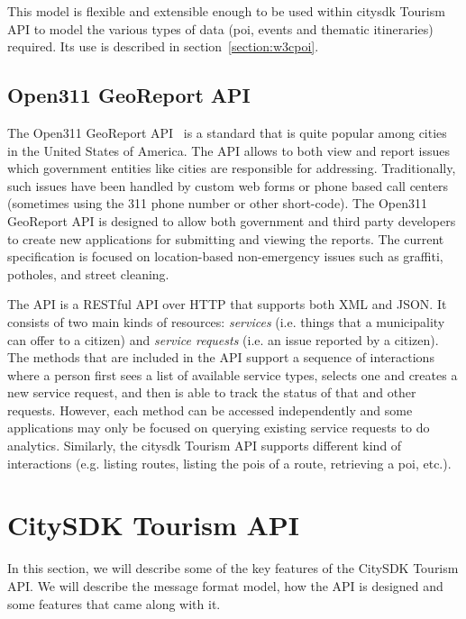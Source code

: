 \documentclass[times,doublespace]{ettauth}%
\begin{document}
This model is flexible and extensible enough to be used within \ac{citysdk} Tourism API to model the various types of data (\ac{poi}, events and thematic itineraries) required.
Its use is described in section~\ref{section:w3cpoi}.

\subsection{Open311 GeoReport API}
The Open311 GeoReport API~\cite{open311} is a standard that is quite popular among cities in the United States of America.
The API allows to both view and report issues which government entities like cities are responsible for addressing.
Traditionally, such issues have been handled by custom web forms or phone based call centers (sometimes using the 311 phone number or other short-code).
The Open311 GeoReport API is designed to allow both government and third party developers to create new applications for submitting and viewing the reports.
The current specification is focused on location-based non-emergency issues such as graffiti, potholes, and street cleaning.

The API is a RESTful API over HTTP that supports both XML and JSON.
It consists of two main kinds of resources: \emph{services} (i.e. things that a municipality can offer to a citizen) and \emph{service requests} (i.e. an issue reported by a citizen).
The methods that are included in the API support a sequence of interactions where a person first sees a list of available service types, selects one and creates a new service request, and then is able to track the status of that and other requests.
However, each method can be accessed independently and some applications may only be focused on querying existing service requests to do analytics.
Similarly, the \ac{citysdk} Tourism API supports different kind of interactions (e.g. listing routes, listing the \acp{poi} of a route, retrieving a \ac{poi}, etc.).


\section{CitySDK Tourism API}
\label{s:tourim-api}
In this section, we will describe some of the key features of the CitySDK Tourism API. We will describe the message format model, how the API is designed and some features that came along with it.
\end{document}
